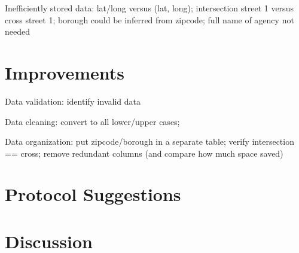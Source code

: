 \documentclass[12pt, titlepage]{article}
\begin{document}
Inefficiently stored data: lat/long versus (lat, long);
intersection street 1 versus cross street 1;
borough could be inferred from zipcode;
full name of agency not needed

\section{Improvements} \label{sec:improve}

Data validation: identify invalid data


Data cleaning: convert to all lower/upper cases;


Data organization: put zipcode/borough in a separate table; verify intersection
== cross; remove redundant columns (and compare how much space saved)


\section{Protocol Suggestions} \label{sec:protocol}



\section{Discussion} \label{sec:disc}




\end{document}
